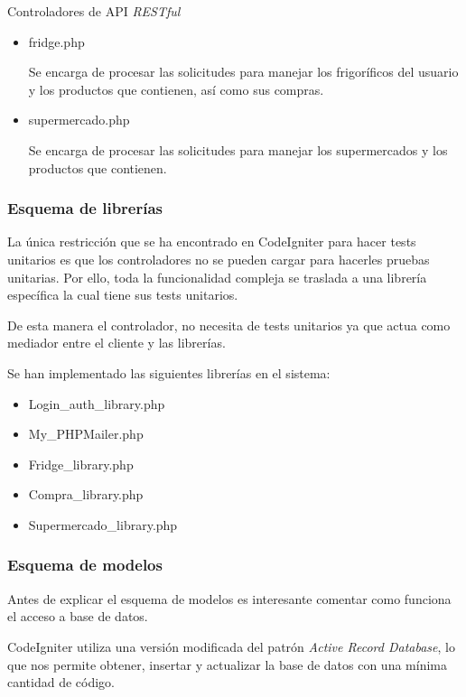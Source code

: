 Controladores de API \emph{RESTful}

    \begin{itemize}
        \item fridge.php

            Se encarga de procesar las solicitudes para manejar los frigoríficos del usuario y los productos que contienen, así como sus compras.

        \item supermercado.php

            Se encarga de procesar las solicitudes para manejar los supermercados y los productos que contienen.

    \end{itemize}

    \subsubsection{Esquema de librerías}

La única restricción que se ha encontrado en CodeIgniter para hacer tests unitarios es que los controladores no se pueden cargar para hacerles pruebas unitarias. Por ello, toda la funcionalidad compleja se traslada a una librería específica la cual tiene sus tests unitarios.

De esta manera el controlador, no necesita de tests unitarios ya que actua como mediador entre el cliente y las librerías.

Se han implementado las siguientes librerías en el sistema:

    \begin{itemize}
        \item Login\_auth\_library.php
        \item My\_PHPMailer.php
        \item Fridge\_library.php
        \item Compra\_library.php
        \item Supermercado\_library.php
    \end{itemize}

    \subsubsection{Esquema de modelos}

        Antes de explicar el esquema de modelos es interesante comentar como funciona el acceso a base de datos.

        CodeIgniter utiliza una versión modificada del patrón \emph{Active Record Database}, lo que nos permite obtener, insertar y actualizar la base de datos con una mínima cantidad de código.

